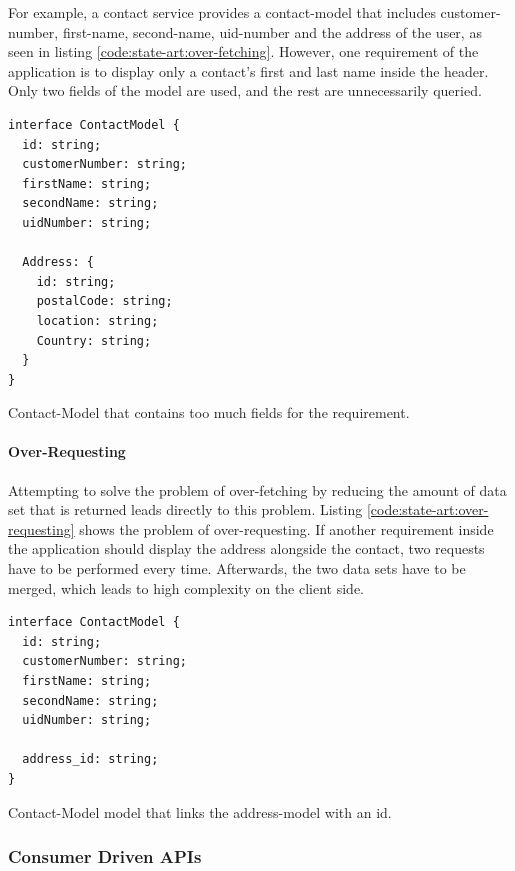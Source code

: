 For example, a contact service provides a contact-model that includes customer-number, first-name, second-name, uid-number and the address of the user, as seen in listing \ref{code:state-art:over-fetching}. However, one requirement of the application is to display only a contact's first and last name inside the header. Only two fields of the model are used, and the rest are unnecessarily queried. \cite{misc:2019:leitner:backend-for-frontends}

\ifshowListings
\begin{listing}[H]
\begin{verbatim}
interface ContactModel {
  id: string;
  customerNumber: string;
  firstName: string;
  secondName: string;
  uidNumber: string;

  Address: {
    id: string;
    postalCode: string;
    location: string;
    Country: string;
  }
}
\end{verbatim}
\caption{Contact-Model that contains too much fields for the requirement.}\label{code:state-art:over-fetching}
\end{listing}
\fi

\paragraph{Over-Requesting}

Attempting to solve the problem of over-fetching by reducing the amount of data set that is returned leads directly to this problem. Listing \ref{code:state-art:over-requesting} shows the problem of over-requesting. If another requirement inside the application should display the address alongside the contact, two requests have to be performed every time. Afterwards, the two data sets have to be merged, which leads to high complexity on the client side. \cite{misc:2019:leitner:backend-for-frontends}

\ifshowListings
\begin{listing}[H]
\begin{verbatim}
interface ContactModel {
  id: string;
  customerNumber: string;
  firstName: string;
  secondName: string;
  uidNumber: string;

  address_id: string;
}
\end{verbatim}
\caption{Contact-Model model that links the address-model with an id.}\label{code:state-art:over-requesting}
\end{listing}
\fi

\subsubsection{Consumer Driven APIs}

